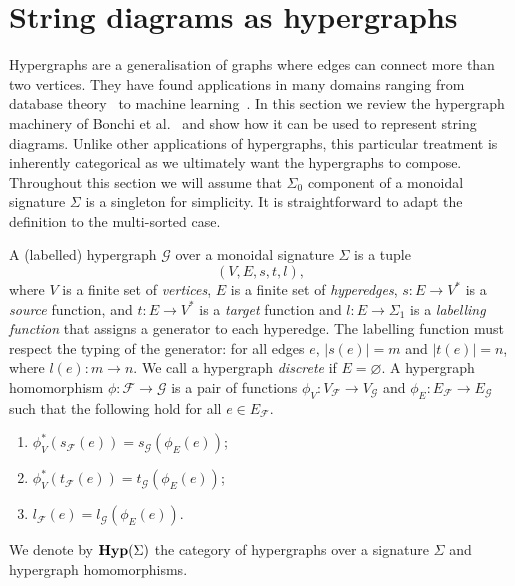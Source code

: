 \section{String diagrams as hypergraphs}
Hypergraphs are a generalisation of graphs where edges can connect more than two vertices.
They have found applications in many domains ranging from database theory~\cite{faginDegreesAcyclicityHypergraphs1983} to machine learning~\cite{fengHypergraphNeuralNetworks2019}.
In this section we review the hypergraph machinery of Bonchi et al.~\cite{bonchi_string_2022-1, bonchi_string_2022-2} and show how it can be used to represent string diagrams.
Unlike other applications of hypergraphs, this particular treatment is inherently categorical as we ultimately want the hypergraphs to compose.
Throughout this section we will assume that $\Sigma_0$ component of a monoidal signature $\Sigma$ is a singleton for simplicity.
It is straightforward to adapt the definition to the multi-sorted case.
\begin{definition}[Hypergraph]\label{def:hypergraph}
  A (labelled) hypergraph $\mathcal{G}$ over a monoidal signature $\Sigma$ is a tuple
  \[
  (V,E,s,t,l),
  \]
  where $V$ is a finite set of \emph{vertices}, $E$ is a finite set of \emph{hyperedges}, $s : E \to V^{*}$ is a \emph{source} function, and $t : E \to V^{*}$ is a \emph{target} function and $l : E \to \Sigma_1$ is a \emph{labelling function} that assigns a generator to each hyperedge.
  The labelling function must respect the typing of the generator: for all edges $e$, $|s(e)| = m$ and $|t(e)| = n$, where $l(e) : m \to n$.
  We call a hypergraph \emph{discrete} if $E = \varnothing$.
  A hypergraph homomorphism $\phi : \mathcal{F} \to \mathcal{G}$ is a pair of functions $\phi_{V} : V_{\mathcal{F}} \to V_{\mathcal{G}}$ and $\phi_{E} : E_{\mathcal{F}} \to E_{\mathcal{G}}$ such that the following hold for all $e \in E_{\mathcal{F}}$.
  \begin{enumerate}
    \item $\phi_{V}^{*}(s_{\mathcal{F}}(e)) = s_{\mathcal{G}}(\phi_{E}(e))$;
    \item $\phi_{V}^{*}(t_{\mathcal{F}}(e)) = t_{\mathcal{G}}(\phi_{E}(e))$;
    \item $l_{\mathcal{F}}(e) = l_{\mathcal{G}}(\phi_{E}(e))$.
  \end{enumerate}
  We denote by $\mathbf{Hyp}(\Sigma)$ the category of hypergraphs over a signature $\Sigma$ and hypergraph homomorphisms.
\end{definition}

